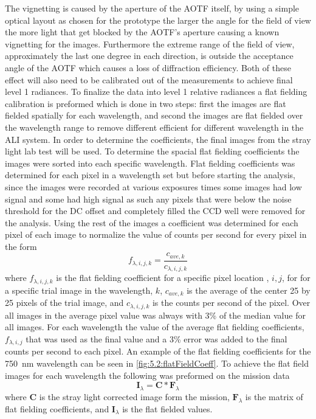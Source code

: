 The vignetting is caused by the aperture of the AOTF itself, by using a simple optical layout as chosen for the prototype the larger the angle for the field of view the more light that get blocked by the AOTF's aperture causing a known vignetting for the images. Furthermore the extreme range of the field of view, approximately the last one degree in each direction, is outside the acceptance angle of the AOTF which causes a loss of diffraction efficiency. Both of these effect will also need to be calibrated out of the measurements to achieve final level 1 radiances. To finalize the data into level 1 relative radiances a flat fielding calibration is preformed which is done in two steps: first the images are flat fielded spatially for each wavelength, and second the images are flat fielded over the wavelength range to remove different efficient for different wavelength in the ALI system. In order to determine the coefficients, the final images from the stray light lab test will be used. To determine the spacial flat fielding coefficients the images were sorted into each specific wavelength. Flat fielding coefficients was determined for each pixel in a wavelength set but before starting the analysis, since the images were recorded at various exposures times some images had low signal and some had high signal as such any pixels that were below the noise threshold for the DC offset and completely filled the CCD well were removed for the analysis. Using the rest of the images a coefficient was determined for each pixel of each image to normalize the value of counts per second for every pixel in the form
\begin{equation}
    f_{\lambda, i, j, k} = \frac{c_{ave, k}}{c_{\lambda, i,j , k}}
\end{equation}
where $f_{\lambda, i, j, k}$ is the flat fielding coefficient for a specific pixel location , $i,j$, for for a specific trial image in the wavelength, $k$, $c_{ave, k}$ is the average of the center 25 by 25 pixels of the trial image, and $c_{\lambda, i,j , k}$ is the counts per second of the pixel. Over all images in the average pixel value was always with 3\% of the median value for all images. For each wavelength the value of the average flat fielding coefficients, $f_{\lambda, i, j}$ that was used as the final value and a 3\% error was added to the final counts per second to each pixel. An example of the flat fielding coefficients for the 750~nm wavelength can be seen in \autoref{fig:5.2:flatFieldCoeff}. To achieve the flat field images for each wavelength the following was preformed on the mission data
\begin{equation}
    \mathbf{I}_{\lambda} = \mathbf{C}*\mathbf{F}_{\lambda}
\end{equation}
where $\mathbf{C}$ is the stray light corrected image form the mission, $\mathbf{F}_{\lambda}$ is the matrix of flat fielding coefficients, and $\mathbf{I}_{\lambda}$ is the flat fielded values.

